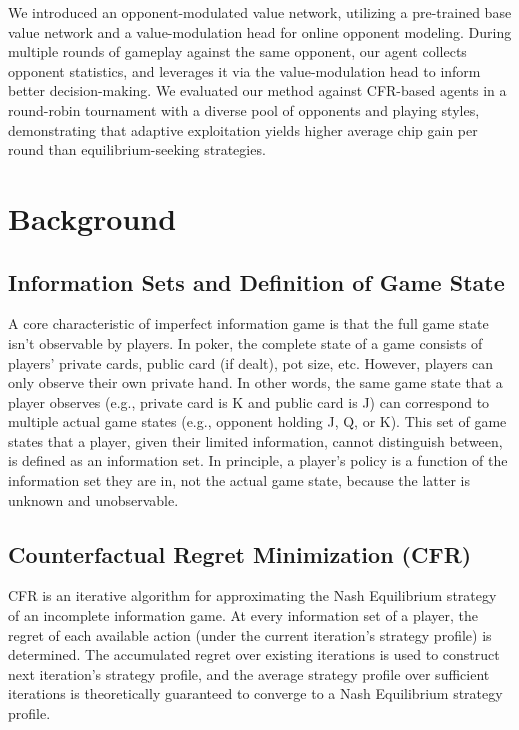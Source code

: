 \documentclass{article}
\begin{document}
We introduced an opponent-modulated value network, utilizing a pre-trained base value network and a value-modulation head for online opponent modeling. During multiple rounds of gameplay against the same opponent, our agent collects opponent statistics, and leverages it via the value-modulation head to inform better decision-making. We evaluated our method against CFR-based agents in a round-robin tournament with a diverse pool of opponents and playing styles, demonstrating that adaptive exploitation yields higher average chip gain per round than equilibrium-seeking strategies.

\section{Background}

\subsection{Information Sets and Definition of Game State}

A core characteristic of imperfect information game is that the full game state isn't observable by players. In poker, the complete state of a game consists of players' private cards, public card (if dealt), pot size, etc. However, players can only observe their own private hand. In other words, the same game state that a player observes (e.g., private card is K and public card is J) can correspond to multiple actual game states (e.g., opponent holding J, Q, or K). This set of game states that a player, given their limited information, cannot distinguish between, is defined as an information set. In principle, a player's policy is a function of the information set they are in, not the actual game state, because the latter is unknown and unobservable.

\subsection{Counterfactual Regret Minimization (CFR)}

CFR is an iterative algorithm for approximating the Nash Equilibrium strategy of an incomplete information game. At every information set of a player, the regret of each available action (under the current iteration's strategy profile) is determined. The accumulated regret over existing iterations is used to construct next iteration's strategy profile, and the average strategy profile over sufficient iterations is theoretically guaranteed to converge to a Nash Equilibrium strategy profile.
\end{document}
